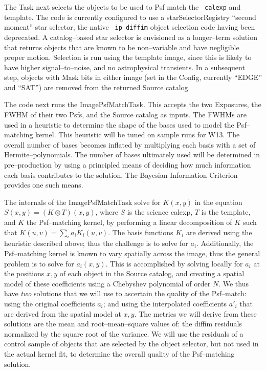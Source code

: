 \documentclass[12pt]{article}
\begin{document}
The Task next selects the objects to be used to Psf match the {\tt
  calexp} and template.  The code is currently configured to use a
starSelectorRegistry ``second moment'' star selector, the native {\tt
  ip\_diffim} object selection code having been deprecated.  A
catalog--based star selector is envisioned as a longer--term solution
that returns objects that are known to be non--variable and have
negligible proper motion.  Selection is run using the template image,
since this is likely to have higher signal--to--noise, and no
astrophysical transients.  In a subsequent step, objects with Mask
bits in either image (set in the Config, currently ``EDGE'' and
``SAT'') are removed from the returned Source catalog.

The code next runs the ImagePsfMatchTask.  This accepts the two
Exposures, the FWHM of their two Psfs, and the Source catalog as
inputs.  The FWHMs are used in a heuristic to determine the shape of
the bases used to model the Psf--matching kernel.  This heuristic will
be tuned on sample runs for W13.  The overall number of bases becomes
inflated by multiplying each basis with a set of Hermite--polynomials.
The number of bases ultimately used will be determined in
pre--production by using a principled means of deciding how much
information each basis contributes to the solution.  The Bayesian
Information Criterion provides one such means.

The internals of the ImagePsfMatchTask solve for $K(x,y)$ in the
equation $S(x,y) = (K \otimes T)(x,y)$, where $S$ is the science
calexp, $T$ is the template, and $K$ the Psf--matching kernel, by
performing a linear decomposition of $K$ such that $K(u,v) = \sum_i
a_i K_i(u,v)$.  The basis functions $K_i$ are derived using the
heuristic described above; thus the challenge is to solve for $a_i$.
Additionally, the Psf--matching kernel is known to vary spatially
across the image, thus the general problem is to solve for $a_i(x,y)$.
This is accomplished by solving locally for $a_i$ at the positions
$x,y$ of each object in the Source catalog, and creating a spatial
model of these coefficients using a Chebyshev polynomial of order $N$.
We thus have {\it two} solutions that we will use to ascertain the
quality of the Psf--match: using the original coefficients $a_i$; and
using the interpolated coefficients $a{'}_i$ that are derived from the
spatial model at $x,y$.  The metrics we will derive from these
solutions are the mean and root--mean--square values of: the diffim
residuals normalized by the square root of the variance.  We will use
the residuals of a control sample of objects that are selected by the
object selector, but not used in the actual kernel fit, to determine
the overall quality of the Psf--matching solution.
\end{document}
